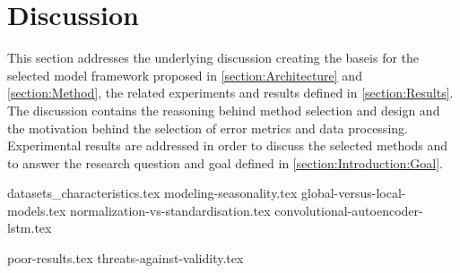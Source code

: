
\section{Discussion}
\label{section:Discussion:Discussion}

This section addresses the underlying discussion creating the baseis for the selected model framework proposed in \cref{section:Architecture} and \cref{section:Method},
the related experiments and results defined in \cref{section:Results}.
The discussion contains the reasoning behind method selection and design
and the motivation behind the selection of error metrics and data processing.
Experimental results are addressed in order to discuss the selected methods and to answer the research question and goal defined in \cref{section:Introduction:Goal}.


\iffalse
  This section presents the underlying discussion creating the basis for the model framework proposed in \Cref{section:Architecture}.
  The discussion concerns the current state of time-series prediction, the motivation behind the method selection, model structure, and the selected error metric.
  This section intendeds to answer the research questions proposed in this paper,
  as well as the reason behind the framework.
\fi




{datasets_characteristics.tex}
{modeling-seasonality.tex}
{global-versus-local-models.tex}
{normalization-vs-standardisation.tex}
{convolutional-autoencoder-lstm.tex}


{poor-results.tex}
{threats-against-validity.tex}











